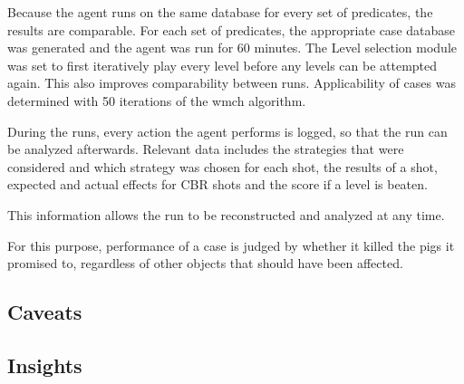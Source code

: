 Because the agent runs on the same database for every set of predicates, the results are comparable. For each set of predicates, the appropriate case database was generated and the agent was run for 60 minutes. The Level selection module was set to first iteratively play every level before any levels can be attempted again.
This also improves comparability between runs. Applicability of cases was determined with 50 iterations of the wmch algorithm.

During the runs, every action the agent performs is logged, so that the run can be analyzed afterwards. Relevant data includes the strategies that were considered and which strategy was chosen for each shot, the results of a shot, expected and actual effects for CBR shots and the score if a level is beaten.

This information allows the run to be reconstructed and analyzed at any time.

For this purpose, performance of a case is judged by whether it killed the pigs it promised to, regardless of other objects that should have been affected.

\subsection{Caveats}\label{subsec:experimental-caveats}
%

%

%
\subsection{Insights}\label{subsec:experimental-insights}



